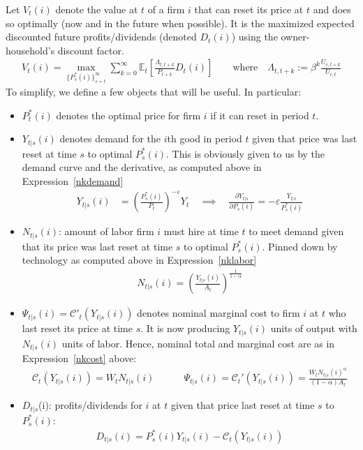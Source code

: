 \documentclass[12pt]{article}
\theoremstyle{plain}
\theoremstyle{definition}
\theoremstyle{remark}
\newcommand{\calC}{\mathcal{C}}
\newcommand{\E}{\mathbb{E}}
\begin{document}
Let $V_t(i)$ denote the value at $t$ of a firm $i$ that can reset
its price at $t$ and does so optimally (now and in the future when
possible). It is the maximized expected discounted future
profits/dividends (denoted $D_t(i)$) using the owner-household's
discount factor.
\begin{align}
  V_t(i)
  =
  \max_{\{P_{s}^*(i)\}_{s=t}^\infty}
  \sum_{k=0}^\infty
  \E_t
  \left[
  \frac{\Lambda_{t,t+k}}{P_{t+k}}
  D_t(i)
  \right]
  \qquad \text{where}\quad
  \Lambda_{t,t+k} := \beta^k\frac{U_{c,t+k}}{U_{c,t}}
  \label{calvovalue}
\end{align}
To simplify, we define a few objects that will be useful.
In particular:
\begin{itemize}
  \item $P^*_t(i)$ denotes the optimal price for firm $i$ if it can
    reset in period $t$.
  \item
    $Y_{t|s}(i)$ denotes demand for the $i$th good in period $t$
    given that price was last reset at time $s$ to optimal
    $P_s^*(i)$.  This is obviously given to us by the demand curve
    and the derivative, as computed above in
    Expression~\ref{nkdemand}
    \begin{align}
      Y_{t|s}(i)
      &=
      \left(
      \frac{P_s^*(i)}{P_t}
      \right)^{-\varepsilon}
      Y_t
      \quad\implies\quad
      \frac{\partial Y_{t|s}}{\partial P_s(i)}
      =
      -\varepsilon
      \frac{Y_{t|s}}{P_s^*(i)}
      \label{calvodemand}
    \end{align}

  \item
    $N_{t|s}(i)$: amount of labor firm $i$ must hire at time $t$
    to meet demand given that its price was last reset at time $s$
    to optimal $P_s^*(i)$. Pinned down by technology as computed
    above in Expression~\ref{nklabor}
    \begin{align}
      N_{t|s}(i) =
      \left(\frac{Y_{t|s}(i)}{A_t}\right)^{\frac{1}{1-\alpha}}
      \label{calvolabor}
    \end{align}

  \item
    $\Psi_{t|s}(i)=\calC'_t(Y_{t|s}(i))$ denotes nominal marginal
    cost to firm $i$ at $t$ who last reset its price at time $s$. It
    is now producing $Y_{t|s}(i)$ units of output with $N_{t|s}(i)$
    units of labor. Hence, nominal total and marginal cost are as in
    Expression~\ref{nkcost} above:
    \begin{align}
      \calC_t(Y_{t|s}(i))=W_tN_{t|s}(i)
      \qquad\quad
      \Psi_{t|s}(i) = \calC_t'(Y_{t|s}(i))
      = \frac{W_t N_{t|s}(i)^\alpha}{(1-\alpha)A_t}
      \label{calvomc}
    \end{align}

  \item
    $D_{t|s}$(i):
    profits/dividends for $i$ at $t$ given that price last reset
    at time $s$ to $P_s^*(i)$:
    \begin{align}
      D_{t|s}(i) =
      P^*_s(i)Y_{t|s}(i) - \calC_t(Y_{t|s}(i))
      \label{calvoprofits}
    \end{align}
\end{itemize}
\end{document}
